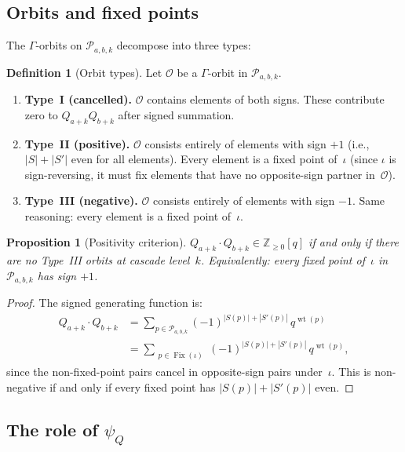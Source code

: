 \documentclass[11pt]{article}
\newcommand{\Z}{\mathbb{Z}}
\DeclareMathOperator{\wt}{wt}
\DeclareMathOperator{\Fix}{Fix}
\theoremstyle{plain}
\newtheorem{proposition}[theorem]{Proposition}
\theoremstyle{definition}
\newtheorem{definition}[theorem]{Definition}
\begin{document}
\subsection{Orbits and fixed points}

The $\Gamma$-orbits on $\mathcal{P}_{a,b,k}$ decompose into
three types:

\begin{definition}[Orbit types]
\label{def:orbit-types}
Let $\mathcal{O}$ be a $\Gamma$-orbit in
$\mathcal{P}_{a,b,k}$.
\begin{enumerate}
  \item \textbf{Type~I (cancelled).}\;
    $\mathcal{O}$ contains elements of both signs.  These
    contribute zero to $Q_{a+k} Q_{b+k}$ after signed
    summation.
  \item \textbf{Type~II (positive).}\;
    $\mathcal{O}$ consists entirely of elements with sign
    $+1$ (i.e., $|S| + |S'|$ even for all elements).  Every
    element is a fixed point of~$\iota$ (since $\iota$ is
    sign-reversing, it must fix elements that have no
    opposite-sign partner in~$\mathcal{O}$).
  \item \textbf{Type~III (negative).}\;
    $\mathcal{O}$ consists entirely of elements with sign
    $-1$.  Same reasoning: every element is a fixed point
    of~$\iota$.
\end{enumerate}
\end{definition}

\begin{proposition}[Positivity criterion]
\label{prop:positivity-criterion}
$Q_{a+k} \cdot Q_{b+k} \in \Z_{\geq 0}[q]$ if and only if
there are no Type~III orbits at cascade level~$k$.
Equivalently: every fixed point of~$\iota$ in
$\mathcal{P}_{a,b,k}$ has sign $+1$.
\end{proposition}

\begin{proof}
The signed generating function is:
\begin{align*}
  Q_{a+k} \cdot Q_{b+k}
  &= \sum_{p \in \mathcal{P}_{a,b,k}}
    (-1)^{|S(p)| + |S'(p)|}\, q^{\wt(p)} \\
  &= \sum_{\substack{p \in \Fix(\iota)}}
    (-1)^{|S(p)| + |S'(p)|}\, q^{\wt(p)},
\end{align*}
since the non-fixed-point pairs cancel in opposite-sign pairs
under~$\iota$.  This is non-negative if and only if every
fixed point has $|S(p)| + |S'(p)|$ even.
\end{proof}


\subsection{The role of $\psi_Q$}
\end{document}
